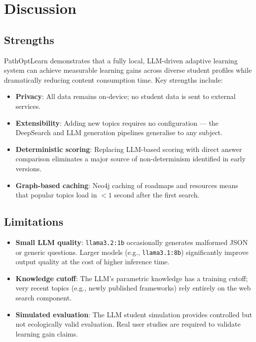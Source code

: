 \documentclass[12pt,a4paper]{article}
\begin{document}
\section{Discussion}

\subsection{Strengths}

PathOptLearn demonstrates that a fully local, LLM-driven adaptive learning
system can achieve measurable learning gains across diverse student profiles
while dramatically reducing content consumption time. Key strengths include:

\begin{itemize}
  \item \textbf{Privacy}: All data remains on-device; no student data is
    sent to external services.
  \item \textbf{Extensibility}: Adding new topics requires no configuration
    — the DeepSearch and LLM generation pipelines generalise to any subject.
  \item \textbf{Deterministic scoring}: Replacing LLM-based scoring with
    direct answer comparison eliminates a major source of non-determinism
    identified in early versions.
  \item \textbf{Graph-based caching}: Neo4j caching of roadmaps and
    resources means that popular topics load in $<1$ second after the
    first search.
\end{itemize}

\subsection{Limitations}

\begin{itemize}
  \item \textbf{Small LLM quality}: \texttt{llama3.2:1b} occasionally
    generates malformed JSON or generic questions. Larger models
    (e.g., \texttt{llama3.1:8b}) significantly improve output quality at
    the cost of higher inference time.
  \item \textbf{Knowledge cutoff}: The LLM's parametric knowledge has a
    training cutoff; very recent topics (e.g., newly published frameworks)
    rely entirely on the web search component.
  \item \textbf{Simulated evaluation}: The LLM student simulation provides
    controlled but not ecologically valid evaluation. Real user studies are
    required to validate learning gain claims.
\end{itemize}
\end{document}
